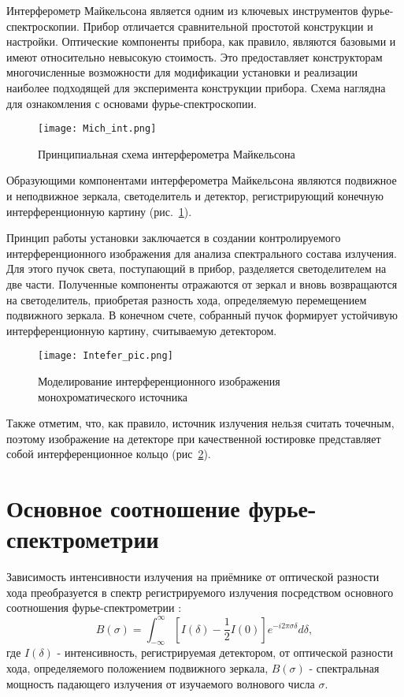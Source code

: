 \documentclass{mipt-thesis-bs}
\begin{document}
	Интерферометр Майкельсона является одним из ключевых инструментов фурье-спектроскопии. Прибор отличается сравнительной простотой конструкции и настройки. Оптические компоненты прибора, как правило, являются базовыми и имеют относительно невысокую стоимость. Это предоставляет конструкторам многочисленные возможности для модификации установки и реализации наиболее подходящей для эксперимента конструкции прибора. Схема наглядна для ознакомления с основами фурье-спектроскопии. 
	
		\begin{figure}[h!]
		\centering
		\texttt{[image: Mich\_int.png]}
		\caption{Принципиальная схема интерферометра Майкельсона}
		\label{fig_michelson}
	\end{figure}
	
 Образующими компонентами интерферометра Майкельсона являются подвижное и неподвижное зеркала, светоделитель и детектор, регистрирующий конечную интерференционную картину (рис.~\ref{fig_michelson}). 
	 
 Принцип работы установки заключается в создании контролируемого интерференционного изображения для анализа спектрального состава излучения. Для этого пучок света, поступающий в прибор, разделяется светоделителем на две части. Полученные  компоненты отражаются от зеркал и вновь возвращаются на светоделитель, приобретая разность хода, определяемую перемещением подвижного зеркала. В конечном счете, собранный пучок формирует устойчивую интерференционную картину, считываемую детектором.
 
   	\begin{figure}[h]
   	\centering
   	\texttt{[image: Intefer\_pic.png]}
   	\caption{Моделирование интерференционного изображения монохроматического источника}
   	\label{fig_NewtonRings}
   \end{figure}

   Также отметим, что, как правило, источник излучения нельзя считать точечным, поэтому изображение на детекторе при качественной юстировке представляет собой интерференционное кольцо (рис~\ref{fig_NewtonRings}). 
	
	\section{Основное соотношение фурье-спектрометрии}
	
	Зависимость интенсивности излучения на приёмнике от оптической разности хода преобразуется в спектр регистрируемого излучения посредством основного соотношения фурье-спектрометрии \cite{белл1975введение}: 
	\begin{equation}
	 B(\sigma)= \int^{\infty}_{-\infty} \left[ I(\delta)-\frac{1}{2} I(0)\right] e^{-i2\pi\sigma\delta} d\delta,
	 \label{eqn_basicspectro}
	\end{equation}
где $I(\delta)$ - интенсивность, регистрируемая детектором, от оптической разности хода, определяемого положением подвижного зеркала, $B(\sigma)$ - спектральная мощность падающего излучения от изучаемого волнового числа $\sigma$.
	
\end{document}
